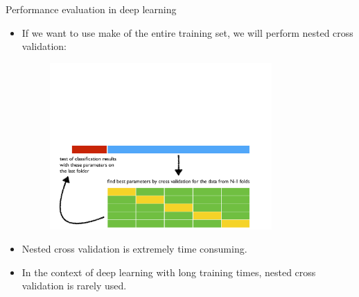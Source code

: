 \documentclass[xcolor=pdftex,dvipsnames,table]{beamer}
\begin{document}
\begin{frame}{Performance evaluation in deep learning}
	\begin{itemize}
		\item<1-> If we want to use make of the entire training set, we will perform nested cross validation:
 		\begin{figure}[htb]
 			\includegraphics[width=0.8\textwidth]{../graphics/CV3.pdf}
 		\end{figure}
		\item<2-> Nested cross validation is extremely time consuming.
		\item<3-> In the context of deep learning with long training times, nested cross validation is rarely used.
	\end{itemize}
\end{frame}

\end{document}
